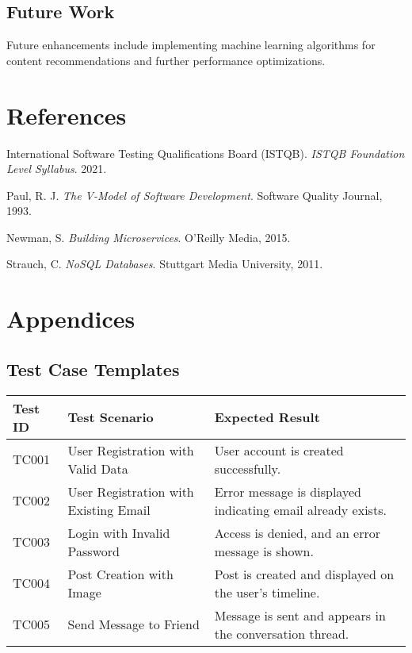 \documentclass[12pt,a4paper]{report}
\begin{document}
\section{Future Work}
Future enhancements include implementing machine learning algorithms for content recommendations and further performance optimizations.

\chapter{References}
\begin{thebibliography}{9}
International Software Testing Qualifications Board (ISTQB). \textit{ISTQB Foundation Level Syllabus}. 2021.

Paul, R. J. \textit{The V-Model of Software Development}. Software Quality Journal, 1993.

Newman, S. \textit{Building Microservices}. O'Reilly Media, 2015.

Strauch, C. \textit{NoSQL Databases}. Stuttgart Media University, 2011.

\end{thebibliography}

\appendix
\chapter{Appendices}
\section{Test Case Templates}
\begin{longtable}{p{2cm} p{4cm} p{8cm}}
\toprule
\textbf{Test ID} & \textbf{Test Scenario} & \textbf{Expected Result} \\
\midrule
TC001 & User Registration with Valid Data & User account is created successfully. \\
TC002 & User Registration with Existing Email & Error message is displayed indicating email already exists. \\
TC003 & Login with Invalid Password & Access is denied, and an error message is shown. \\
TC004 & Post Creation with Image & Post is created and displayed on the user's timeline. \\
TC005 & Send Message to Friend & Message is sent and appears in the conversation thread. \\
\bottomrule
\end{longtable}
\end{document}
